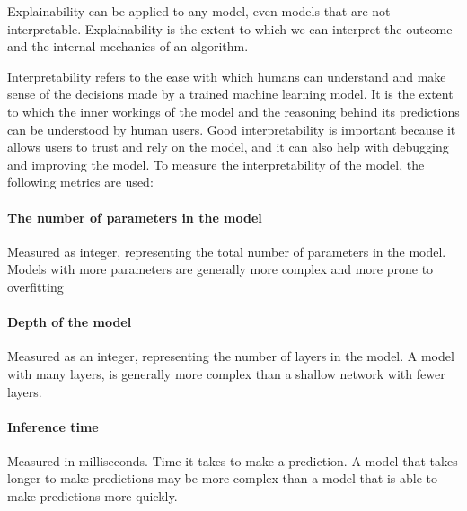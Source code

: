 Explainability can be applied to any model, even models that are not interpretable. Explainability is the extent to which we can interpret the outcome and the internal mechanics of an algorithm.




Interpretability refers to the ease with which humans can understand and make sense of the decisions made by a trained machine learning model. \cite[p. 16]{siebert_constructionqualitymodel_} It is the extent to which the inner workings of the model and the reasoning behind its predictions can be understood by human users. Good interpretability is important because it allows users to trust and rely on the model, and it can also help with debugging and improving the model.
To measure the interpretability of the model, the following metrics are used:

\paragraph*{The number of parameters in the model}
Measured as integer, representing the total number of parameters in the model.
Models with more parameters are generally more complex and more prone to overfitting

\paragraph*{Depth of the model}
Measured as an integer, representing the number of layers in the model.
A model with many layers, is generally more complex than a shallow network with fewer layers.

\paragraph*{Inference time}
Measured in milliseconds. Time it takes to make a prediction.
A model that takes longer to make predictions may be more complex than a model that is able to make predictions more quickly.

